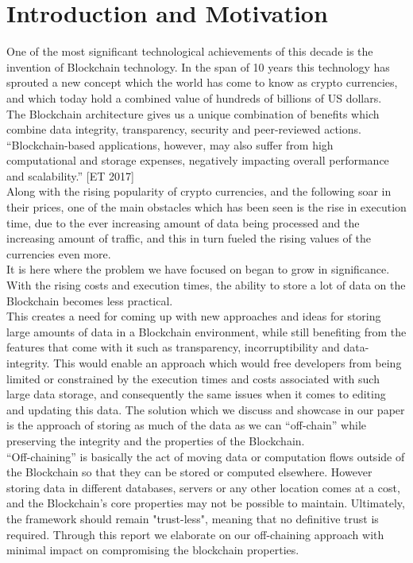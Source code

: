 \section{Introduction and Motivation}

One of the most significant technological achievements of this decade is the invention of Blockchain technology. In the span of 10 years this technology has sprouted a new concept which the world has come to know as crypto currencies, and which today hold a combined value of hundreds of billions of US dollars. \\

The Blockchain architecture gives us a unique combination of benefits which combine data integrity, transparency, security and peer-reviewed actions.
“Blockchain-based applications, however, may also suffer from high computational and storage expenses, negatively impacting overall performance and scalability.” [ET 2017]\\

Along with the rising popularity of crypto currencies, and the following soar in their prices, one of the main obstacles which has been seen is the rise in execution time, due to the ever increasing amount of data being processed and the increasing amount of traffic, and this in turn fueled the rising values of the currencies even more.  \\

It is here where the problem we have focused on began to grow in significance. With the rising costs and execution times, the ability to store a lot of data on the Blockchain becomes less practical. \\

This creates a need for coming up with new approaches and ideas for storing large amounts of data in a Blockchain environment, while still benefiting from the features that come with it such as transparency, incorruptibility and data-integrity. This would enable an approach which would free developers from being limited or constrained by the execution times and costs associated with such large data storage, and consequently the same issues when it comes to editing and updating this data. The solution which we discuss and showcase in our paper is the approach of storing as much of the data as we can “off-chain” while preserving the integrity and the properties of the Blockchain.\\

“Off-chaining” is basically the act of moving data or computation flows outside of the Blockchain so that they can be stored or computed elsewhere. However storing data in different databases, servers or any other location comes at a cost, and the Blockchain’s core properties may not be possible to maintain. Ultimately, the framework should remain "trust-less", meaning that no definitive trust is required. Through this report we elaborate on our off-chaining approach with minimal impact on compromising the blockchain properties.\\

